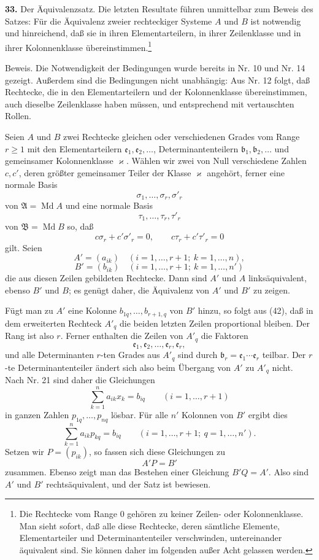 \documentclass[11pt,a4paper]{article}
\begin{document}
\textbf{33.} Der Äquivalenzsatz. Die letzten Resultate führen unmittelbar zum Beweis des Satzes: Für die Äquivalenz zweier rechteckiger Systeme \(A\) und \(B\) ist notwendig und hinreichend, daß sie in ihren Elementarteilern, in ihrer Zeilenklasse und in ihrer Kolonnenklasse übereinstimmen.\footnote{Die Rechtecke vom Range \(0\) gehören zu keiner Zeilen- oder Kolonnenklasse. Man sieht sofort, daß alle diese Rechtecke, deren sämtliche Elemente, Elementarteiler und Determinantenteiler verschwinden, untereinander äquivalent sind. Sie können daher im folgenden außer Acht gelassen werden.}

Beweis. Die Notwendigkeit der Bedingungen wurde bereits in Nr. 10 und Nr. 14 gezeigt. Außerdem sind die Bedingungen nicht unabhängig: Aus Nr. 12 folgt, daß Rechtecke, die in den Elementarteilern und der Kolonnenklasse übereinstimmen, auch dieselbe Zeilenklasse haben müssen, und entsprechend mit vertauschten Rollen.

Seien \(A\) und \(B\) zwei Rechtecke gleichen oder verschiedenen Grades vom Range \(r\ge1\) mit den Elementarteilern \(\mathfrak e_1,\mathfrak e_2,\ldots\), Determinantenteilern \(\mathfrak b_1,\mathfrak b_2,\ldots\) und gemeinsamer Kolonnenklasse \(\varkappa\). Wählen wir zwei von Null verschiedene Zahlen \(c,c'\), deren größter gemeinsamer Teiler der Klasse \(\varkappa\) angehört, ferner eine normale Basis
\[
 \sigma_1,\ldots,\sigma_r,\sigma'_r
\]
von \(\mathfrak A=\operatorname{Md}A\) und eine normale Basis
\[
 \tau_1,\ldots,\tau_r,\tau'_r
\]
von \(\mathfrak B=\operatorname{Md}B\) so, daß
\[
 c\sigma_r+c'\sigma'_r=0,\qquad c\tau_r+c'\tau'_r=0 \tag{42}
\]
gilt. Seien
\[
 A'=(a_{ik})\quad(i=1,\ldots,r+1;\ k=1,\ldots,n),
\]
\[
 B'=(b_{ik})\quad(i=1,\ldots,r+1;\ k=1,\ldots,n')
\]
die aus diesen Zeilen gebildeten Rechtecke. Dann sind \(A'\) und \(A\) linksäquivalent, ebenso \(B'\) und \(B\); es genügt daher, die Äquivalenz von \(A'\) und \(B'\) zu zeigen.

Fügt man zu \(A'\) eine Kolonne \(b_{1q},\ldots,b_{r+1,q}\) von \(B'\) hinzu, so folgt aus (42), daß in dem erweiterten Rechteck \(A'_q\) die beiden letzten Zeilen proportional bleiben. Der Rang ist also \(r\). Ferner enthalten die Zeilen von \(A'_q\) die Faktoren
\[
 \mathfrak e_1,\mathfrak e_2,\ldots,\mathfrak e_r,\mathfrak e_r,
\]
und alle Determinanten \(r\)-ten Grades aus \(A'_q\) sind durch \(\mathfrak b_r=\mathfrak e_1\cdots\mathfrak e_r\) teilbar. Der \(r\)-te Determinantenteiler ändert sich also beim Übergang von \(A'\) zu \(A'_q\) nicht. Nach Nr. 21 sind daher die Gleichungen
\[
 \sum_{k=1}^{n}a_{ik}x_k=b_{iq}\qquad(i=1,\ldots,r+1)
\]
in ganzen Zahlen \(p_{1q},\ldots,p_{nq}\) lösbar. Für alle \(n'\) Kolonnen von \(B'\) ergibt dies
\[
 \sum_{k=1}^{n}a_{ik}p_{kq}=b_{iq}\qquad(i=1,\ldots,r+1;\ q=1,\ldots,n'). \tag{43}
\]
Setzen wir \(P=(p_{ik})\), so fassen sich diese Gleichungen zu
\[
 A'P=B'
\]
zusammen. Ebenso zeigt man das Bestehen einer Gleichung \(B'Q=A'\). Also sind \(A'\) und \(B'\) rechtsäquivalent, und der Satz ist bewiesen.
\end{document}
